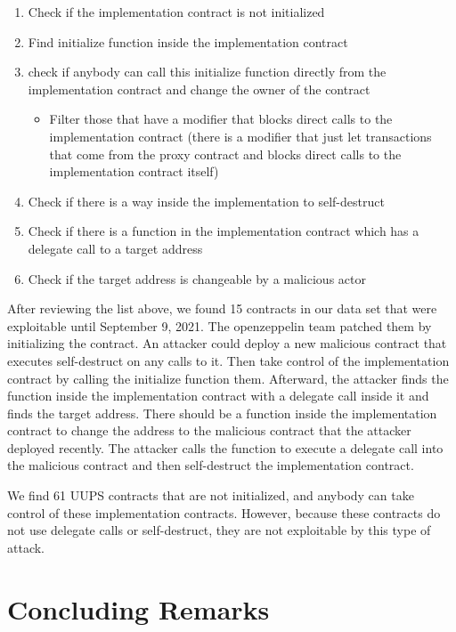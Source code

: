 \begin{enumerate}
\item Check if the implementation contract is not initialized
\item Find initialize function inside the implementation contract
\item check if anybody can call this initialize function directly from the implementation contract and change the owner of the contract
\begin{itemize}
\item Filter those that have a modifier that blocks direct calls to the implementation contract (there is a modifier that just let transactions that come from the proxy contract and blocks direct calls to the implementation contract itself)
\end{itemize}
\item Check if there is a way inside the implementation to self-destruct 
\item Check if there is a function in the implementation contract which has a delegate call to a target address
\item Check if the target address is changeable by a malicious actor
\end{enumerate}

After reviewing the list above, we found 15 contracts in our data set that were exploitable until September 9, 2021. The openzeppelin team patched them by initializing the contract. An attacker could deploy a new malicious contract that executes self-destruct on any calls to it. Then take control of the implementation contract by calling the initialize function them. Afterward, the attacker finds the function inside the implementation contract with a delegate call inside it and finds the target address. There should be a function inside the implementation contract to change the address to the malicious contract that the attacker deployed recently. The attacker calls the function to execute a delegate call into the malicious contract and then self-destruct the implementation contract.

We find 61 UUPS contracts that are not initialized, and anybody can take control of these implementation contracts. However, because these contracts do not use delegate calls or self-destruct, they are not exploitable by this type of attack.


\section{Concluding Remarks}

